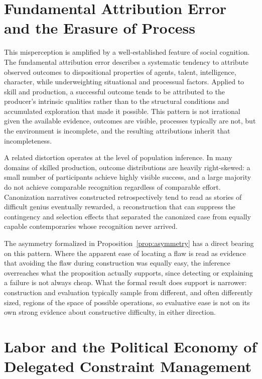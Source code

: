 \section{Fundamental Attribution Error and the Erasure of Process}

This misperception is amplified by a well-established feature of social cognition. The fundamental attribution error describes a systematic tendency to attribute observed outcomes to dispositional properties of agents, talent, intelligence, character, while underweighting situational and processual factors. Applied to skill and production, a successful outcome tends to be attributed to the producer's intrinsic qualities rather than to the structural conditions and accumulated exploration that made it possible. This pattern is not irrational given the available evidence, outcomes are visible, processes typically are not, but the environment is incomplete, and the resulting attributions inherit that incompleteness.

A related distortion operates at the level of population inference. In many domains of skilled production, outcome distributions are heavily right-skewed: a small number of participants achieve highly visible success, and a large majority do not achieve comparable recognition regardless of comparable effort. Canonization narratives constructed retrospectively tend to read as stories of difficult genius eventually rewarded, a reconstruction that can suppress the contingency and selection effects that separated the canonized case from equally capable contemporaries whose recognition never arrived.

The asymmetry formalized in Proposition~\ref{prop:asymmetry} has a direct bearing on this pattern. Where the apparent ease of locating a flaw is read as evidence that avoiding the flaw during construction was equally easy, the inference overreaches what the proposition actually supports, since detecting or explaining a failure is not always cheap. What the formal result does support is narrower: construction and evaluation typically sample from different, and often differently sized, regions of the space of possible operations, so evaluative ease is not on its own strong evidence about constructive difficulty, in either direction.

\section{Labor and the Political Economy of Delegated Constraint Management}

